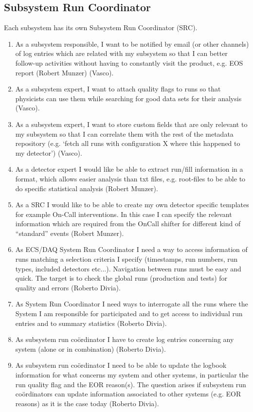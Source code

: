 \subsection{Subsystem Run Coordinator}
Each subsystem has its own Subsystem Run Coordinator (SRC). 
\begin{enumerate}
  \item As a subsystem responsible, I want to be notified by email (or other channels) of log entries which are related with my subsystem so that I can better follow-up activities without having to constantly visit the product, e.g. EOS report (Robert Munzer) (Vasco). 
  \item As a subsystem expert, I want to attach quality flags to runs so that physicists can use them while searching for good data sets for their analysis (Vasco). 
  \item As a subsystem expert, I want to store custom fields that are only relevant to my subsystem so that I can correlate them with the rest of the metadata repository (e.g. ‘fetch all runs with configuration X where this happened to my detector’) (Vasco). 
  \item As a detector expert I would like be able to extract run/fill information in a format, which allows easier
analysis than txt files, e.g. root-files to be able to do specific statistical analysis (Robert Munzer).
  \item As a SRC I would like to be able to create my own detector specific templates for example On-Call interventions. In this case I can specify the relevant information which are required from the OnCall shifter for different kind of “standard” events (Robert Munzer).
  \item As ECS/DAQ System Run Coordinator I need a way to access information of runs matching a selection criteria I specify (timestamps, run numbers, run types, included detectors etc...). Navigation between runs must be easy and quick. The target is to check the global runs (production and tests) for quality and errors (Roberto Divia).
  \item As System Run Coordinator I need ways to interrogate all the runs where the System I am responsible for participated and to get access to individual run entries and to summary statistics (Roberto Divia).
  \item As subsystem run co\"ordinator I have to create log entries concerning any system (alone or in combination) (Roberto Divia).
  \item As subsystem run co\"ordinator I need to be able to update the logbook information for what concerns my system and other systems, in particular the run quality flag and the EOR reason(s). The question arises if subsystem run co\"ordinators can update information associated to other systems (e.g. EOR reasons) as it is the case today (Roberto Divia).

\end{enumerate}
